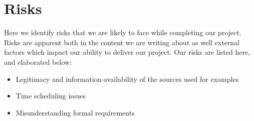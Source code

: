 \section{Risks}
\label{sec:risks}
Here we identify risks that we are likely to face while completing our project. Risks are apparent both in the content we are writing about as well external factors which impact our ability to deliver our project. Our risks are listed here, and elaborated below:\par
\vspace{0.2cm}

\begin{itemize}

  \item Legitimacy and information-availability of the sources used for examples
  \item Time scheduling issues
  \item Misunderstanding formal requirements

\end{itemize}


